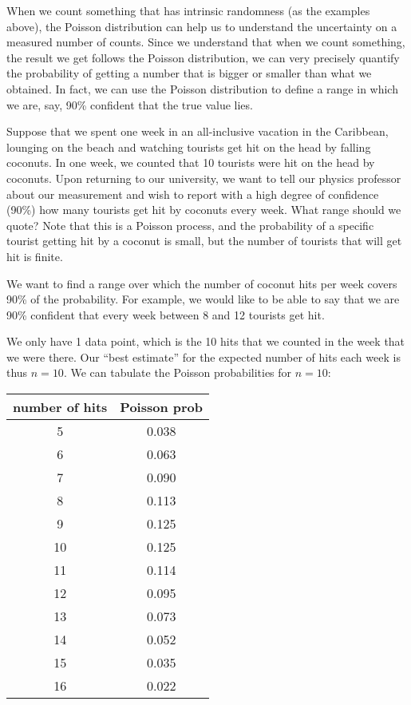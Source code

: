 When we count something that has intrinsic randomness (as the examples above), the Poisson distribution can help us to understand the uncertainty on a measured number of counts. Since we understand that when we count something, the result we get follows the Poisson distribution, we can very precisely quantify the probability of getting a number that is bigger or smaller than what we obtained. In fact, we can use the Poisson distribution to define a range in which we are, say, 90\% confident that the true value lies.
\vspace{-0.3cm}
\begin{example}{Suppose that we spent one week in an all-inclusive vacation in the Caribbean, lounging on the beach and watching tourists get hit on the head by falling coconuts. In one week, we counted that 10 tourists were hit on the head by coconuts. Upon returning to our university, we want to tell our physics professor about our measurement and wish to report with a high degree of confidence (90\%) how many tourists get hit by coconuts every week. What range should we quote?}
\label{ex:PoissonCoconut}
Note that this is a Poisson process, and the probability of a specific tourist getting hit by a coconut is small, but the number of tourists that will get hit is finite.

We want to find a range over which the number of coconut hits per week covers 90\% of the probability. For example, we would like to be able to say that we are 90\% confident that every week between 8 and 12 tourists get hit. 

We only have 1 data point, which is the 10 hits that we counted in the week that we were there. Our ``best estimate'' for the expected number of hits each week is thus $n=10$. We can tabulate the Poisson probabilities for $n=10$:

\begin{center}
\begin{tabular}{|c|c|}
\hline
number of hits & Poisson prob\\
\hline
5 & 0.038 \\
\hline
6 & 0.063 \\
\hline
7 & 0.090 \\
\hline
8 & 0.113 \\
\hline
9 & 0.125 \\
\hline
\cellcolor{gray!25} 10 & \cellcolor{gray!25} 0.125 \\
\hline
11 & 0.114 \\
\hline
12 & 0.095 \\
\hline
13 & 0.073 \\
\hline
14 & 0.052 \\
\hline
15 & 0.035 \\
\hline
16 & 0.022 \\
\hline
\end{tabular}
\end{center}


\end{example}
